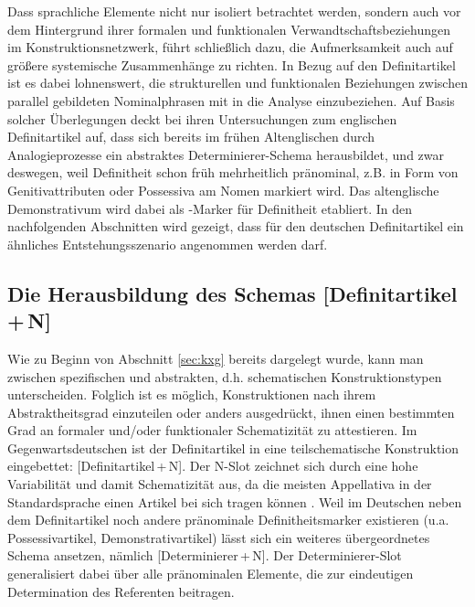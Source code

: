 Dass sprachliche Elemente nicht nur isoliert betrachtet werden, sondern auch vor dem Hintergrund ihrer formalen und funktionalen Verwandtschaftsbeziehungen im Konstruktionsnetzwerk, führt schließlich dazu, die Aufmerksamkeit auch auf größere systemische Zusammenhänge zu richten. In Bezug auf den Definitartikel ist es dabei lohnenswert, die strukturellen und funktionalen Beziehungen zwischen parallel gebildeten Nominalphrasen mit in die Analyse einzubeziehen. Auf Basis solcher Überlegungen deckt \textcite{Sommerer2011,Sommerer2012,Sommerer2015} bei ihren Untersuchungen zum englischen Definitartikel auf, dass sich bereits im frühen Altenglischen durch Analogieprozesse ein abstraktes Determinierer-Schema herausbildet, und zwar deswegen, weil Definitheit schon früh mehrheitlich pränominal, z.B. in Form von Genitivattributen oder Possessiva am Nomen markiert wird. Das altenglische Demonstrativum  wird dabei als -Marker für Definitheit etabliert. In den nachfolgenden Abschnitten wird gezeigt, dass für den deutschen Definitartikel ein ähnliches Entstehungsszenario angenommen werden darf. 

\subsection{Die Herausbildung des Schemas [Definitartikel\,+\,N]}\label{sec:schema}

Wie zu Beginn von Abschnitt \ref{sec:kxg} bereits dargelegt wurde, kann man zwischen spezifischen  und abstrakten, d.h. schematischen Konstruktionstypen unterscheiden.
Folglich ist es möglich, Konstruktionen nach ihrem Abstraktheitsgrad einzuteilen oder anders ausgedrückt, ihnen einen bestimmten Grad an formaler und/oder funktionaler Schematizität zu attestieren. Im Gegenwartsdeutschen ist der Definitartikel in eine teilschematische Konstruktion eingebettet: [Definitartikel\,+\,N]. Der N-Slot zeichnet sich durch eine hohe Variabilität und damit Schematizität aus, da die meisten Appellativa in der Standardsprache einen Artikel bei sich tragen können \parencite[zu den Ausnahmen s.][]{DAvis2013}.
Weil im Deutschen neben dem Definitartikel noch andere pränominale Definitheitsmarker existieren (u.a. Possessivartikel, Demonstrativartikel) lässt sich ein weiteres übergeordnetes Schema ansetzen, nämlich [Determinierer\,+\,N]. Der Determinierer-Slot generalisiert dabei über alle pränominalen Elemente, die zur eindeutigen Determination des Referenten beitragen. 


